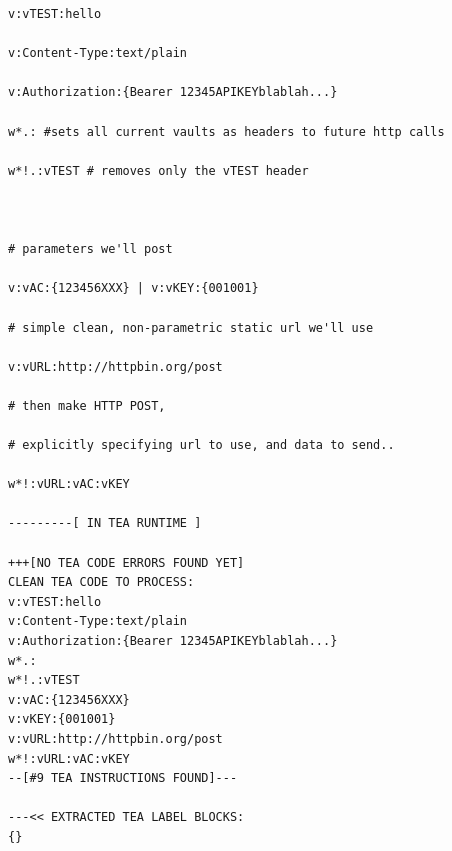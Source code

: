 \documentclass[a4paper, 18pt]{book} %
\begin{document}
{{{\begin{tcolorbox}[myterminalstyle, title=DEBUGGING a TEA custom HTTP HEADERS with HTTP POST scenario, breakable]
\begin{lstlisting}[breaklines=true]
v:vTEST:hello

v:Content-Type:text/plain

v:Authorization:{Bearer 12345APIKEYblablah...}

w*.: #sets all current vaults as headers to future http calls

w*!.:vTEST # removes only the vTEST header



# parameters we'll post 

v:vAC:{123456XXX} | v:vKEY:{001001}

# simple clean, non-parametric static url we'll use

v:vURL:http://httpbin.org/post

# then make HTTP POST, 

# explicitly specifying url to use, and data to send..

w*!:vURL:vAC:vKEY

---------[ IN TEA RUNTIME ]

+++[NO TEA CODE ERRORS FOUND YET]
CLEAN TEA CODE TO PROCESS:
v:vTEST:hello
v:Content-Type:text/plain
v:Authorization:{Bearer 12345APIKEYblablah...}
w*.: 
w*!.:vTEST 
v:vAC:{123456XXX} 
v:vKEY:{001001}
v:vURL:http://httpbin.org/post
w*!:vURL:vAC:vKEY
--[#9 TEA INSTRUCTIONS FOUND]---

---<< EXTRACTED TEA LABEL BLOCKS:
{}


\end{lstlisting}
\end{tcolorbox}}}}
\end{document}
